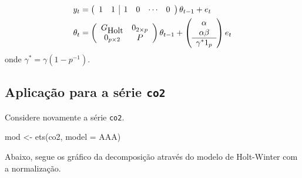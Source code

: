 \documentclass[
  letterpaper,
  DIV=11,
  numbers=noendperiod]{scrreprt}
\newenvironment{Shaded}{\begin{snugshade}}{\end{snugshade}}
\newcommand{\AttributeTok}[1]{\textcolor[rgb]{0.40,0.45,0.13}{#1}}
\newcommand{\DecValTok}[1]{\textcolor[rgb]{0.68,0.00,0.00}{#1}}
\newcommand{\FunctionTok}[1]{\textcolor[rgb]{0.28,0.35,0.67}{#1}}
\newcommand{\NormalTok}[1]{\textcolor[rgb]{0.00,0.23,0.31}{#1}}
\newcommand{\OtherTok}[1]{\textcolor[rgb]{0.00,0.23,0.31}{#1}}
\newcommand{\SpecialCharTok}[1]{\textcolor[rgb]{0.37,0.37,0.37}{#1}}
\newcommand{\StringTok}[1]{\textcolor[rgb]{0.13,0.47,0.30}{#1}}
\theoremstyle{definition}
\theoremstyle{plain}
\theoremstyle{definition}
\theoremstyle{plain}
\theoremstyle{remark}
\begin{document}
\[\begin{align}
y_t&=\left(\begin{array}{cc|cccc}1&1&1&0&\cdots&0\end{array}\right)\theta_{t-1}+e_t\\
\theta_t&=\left(\begin{array}{cc}G_{\hbox{Holt}} & 0_{2\times p}\\
0_{p\times 2} & P\end{array}\right)\theta_{t-1}+\left(\begin{array}{c}\alpha \\ \alpha\beta \\ \hline \gamma^*1_p \end{array}\right)e_t\end{align}\]
onde \(\gamma^*=\gamma(1-p^{-1})\).

\hypertarget{aplicauxe7uxe3o-para-a-suxe9rie-co2}{%
\subsection{\texorpdfstring{Aplicação para a série
\texttt{co2}}{Aplicação para a série co2}}\label{aplicauxe7uxe3o-para-a-suxe9rie-co2}}

Considere novamente a série \texttt{co2}.

\begin{Shaded}
\begin{Highlighting}[]
\NormalTok{mod }\OtherTok{\textless{}{-}} \FunctionTok{ets}\NormalTok{(co2, }\AttributeTok{model =} \StringTok{\textquotesingle{}AAA\textquotesingle{}}\NormalTok{)}
\end{Highlighting}
\end{Shaded}

Abaixo, segue os gráfico da decomposição através do modelo de
Holt-Winter com a normalização.

\begin{Shaded}
\end{Shaded}
\end{document}
